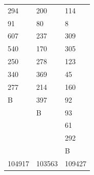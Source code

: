 \begin{table}[htp!]
\begin{minipage}[h]{0.48\linewidth}
\begin{tabularx}{0.9\textwidth}{|Y|Y|Y|}
  294    & 200     & 114   \\
   91     & 80     & 8   \\
   607    & 237     & 309   \\
   540    & 170    & 305  \\
   250    & 278    & 123  \\
   340    & 369     & 45   \\
   277    & 214    & 160  \\
  B      & 397   & 92 \\
        &  B     &  93      \\
         &         &  61      \\
        &         &   292     \\
        &         &   B     \\
 104917  &  103563  &109427 \\
\hline
\end{tabularx}
\end{minipage}
\end{table}

